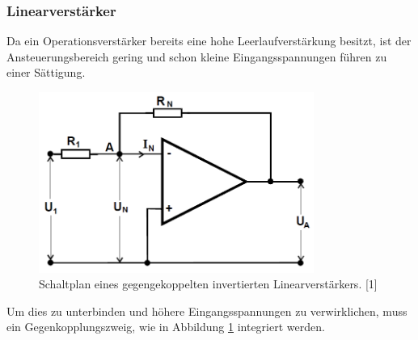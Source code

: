 \documentclass[]{scrartcl}
\begin{document}
\subsubsection{Linearverstärker}
Da ein Operationsverstärker bereits eine hohe Leerlaufverstärkung besitzt, ist der Ansteuerungsbereich gering und schon kleine Eingangsspannungen führen zu einer Sättigung.
\begin{figure}[H]
\centering
\includegraphics[width=9cm]{images/schaltplan_linearverstaerker.png}
\caption{Schaltplan eines gegengekoppelten invertierten Linearverstärkers. [1]}
\label{fig:schaltplan_linearverstaerker}
\end{figure}
Um dies zu unterbinden und höhere Eingangsspannungen zu verwirklichen, muss ein Gegenkopplungszweig, wie in Abbildung \ref{fig:schaltplan_linearverstaerker} integriert werden.
\end{document}
